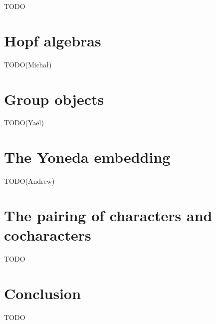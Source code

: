 \documentclass{article}
\begin{document}
TODO


\section{Hopf algebras}\label{sec:hopf}


TODO(Michał)


\section{Group objects}\label{sec:grp}


TODO(Yaël)


\section{The Yoneda embedding}\label{sec:yoneda}


TODO(Andrew)


\section{The pairing of characters and cocharacters}\label{sec:char-cochar}


TODO


\section{Conclusion}\label{sec:conclusion}


TODO




\end{document}
